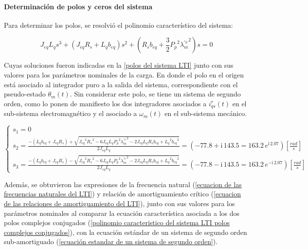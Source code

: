 \documentclass[a4paper, 10pt, onecolumn,journal]{ieeeconf}
\begin{document}
\paragraph{\textbf{Determinación de polos y ceros del sistema}}
Para determinar los polos, se resolvió el polinomio característico del sistema:

\begin{equation}
	J_{eq} L_{q} s^3 +\left( J_{eq} R_{s} + L_{q} b_{eq} \right)s^2 + \left( R_{s} b_{eq} + \dfrac{3}{2} {P_{p}}^2 { \lambda^{'r}_m}^2\right) s = 0
    \label{polinomio caracteristico del sistema LTI}
\end{equation}

Cuyas soluciones fueron indicadas en la \cref{polos del sistema LTI} junto con sus valores
para los parámetros nominales de la carga.
En donde el polo en el origen está asociado al integrador puro a la salida
del sistema, correspondiente con
el pseudo-estado $\theta_m(t)$. Sin considerar este polo, se tiene un sistema de
segundo orden, como lo ponen de manifiesto los dos integradores asociados a $i^r_{qs}(t)$ en el
sub-sistema electromagnético y el asociado a $\omega_m(t)$ en el sub-sistema mecánico.

\begin{equation}
	\begin{cases}
		s_1 = 0\\
		s_2 = \frac{-\left( L_{q} b_{eq} + J_{eq} R_{s}\right)  + \sqrt{{J_{eq}}^2 {R_{s}}^2 - 6 J_{eq} L_{q} {P_{p}}^2 {\lambda^{'r}_m}^2 - 2 J_{eq} L_{q} R_{s} b_{eq}+{L_{q}}^2 {b_{eq}}^2} }{2 J_{eq} L_{q}} = \left(-77.8+\mathrm{i} \, 143.5 = 163.2 \, e^{\mathrm{i} \, 2.07}\right)\left[\frac{rad}{s}\right]\\
		s_3 = \frac{-\left( L_{q} b_{eq} + J_{eq} R_{s}\right)  - \sqrt{{J_{eq}}^2 {R_{s}}^2 - 6 J_{eq} L_{q} {P_{p}}^2 {\lambda^{'r}_m}^2 - 2 J_{eq} L_{q} R_{s} b_{eq}+{L_{q}}^2 {b_{eq}}^2} }{2 J_{eq} L_{q}} = \left(-77.8-\mathrm{i} \, 143.5 = 163.2 \, e^{-\mathrm{i} \, 2.07}\right)\left[\frac{rad}{s}\right]
	\end{cases}\label{polos del sistema LTI}
\end{equation}

Además, se obtuvieron las expresiones de la frecuencia natural (\cref{ecuacion de las frecuencias naturales del LTI}) y relación de amortiguamiento crítico (\cref{ecuacion de las relaciones de amortiguamiento del LTI}), junto con sus valores
para los parámetros nominales al comparar la ecuación característica asociada a los dos polos complejos conjugados (\cref{polinomio caracteristico del sistema LTI polos complejos conjugados}), con  la ecuación estándar de un sistema de segundo orden sub-amortiguado (\cref{ecuación estandar de un sistema de segundo orden}).
\end{document}
